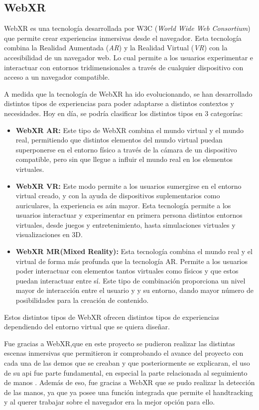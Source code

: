 \documentclass[a4paper, 12pt]{book}
\begin{document}
\subsection{WebXR}
\label{subsec:WebXR}

WebXR \cite{onirix2024} es una tecnología desarrollada por W3C (\textit{World Wide Web Consortium}) que permite crear experiencias inmersivas desde el navegador. Esta tecnología combina la Realidad Aumentada (\textit{AR}) y la Realidad Virtual (\textit{VR}) con la accesibilidad de un navegador web.
Lo cual permite a los usuarios experimentar e interactuar con entornos tridimensionales a través de cualquier dispositivo con acceso a un navegador compatible.

A medida que la tecnología de WebXR ha ido evolucionando, se han desarrollado distintos tipos de experiencias para poder adaptarse a distintos contextos y necesidades. Hoy en día, se podría clasificar los distintos tipos en 3 categorías:
\begin{itemize}
  \item \textbf{WebXR AR:} Este tipo de WebXR combina el mundo virtual y el mundo real, permitiendo que distintos elementos del mundo virtual puedan superponerse en el entorno físico a través
        de la cámara de un dispositivo compatible, pero sin que llegue a influir el mundo real en los elementos virtuales.
  \item \textbf{WebXR VR:} Este modo permite a los usuarios sumergirse en el entorno virtual creado, y con la ayuda de dispositivos suplementarios como auriculares, la experiencia es aún mayor. Esta tecnología permite a los usuarios
        interactuar y experimentar en primera persona distintos entornos virtuales, desde juegos y entretenimiento, hasta simulaciones virtuales y visualizaciones en 3D.
  \item \textbf{WebXR MR(Mixed Reality):} Esta tecnología combina el mundo real y el virtual de forma más profunda que la tecnología AR. Permite a los usuarios poder interactuar con elementos tantos virtuales como físicos y que estos puedan interactuar entre sí. Este tipo de combinación proporciona un nivel mayor de interacción entre el usuario y
        y su entorno, dando mayor número de posibilidades para la creación de contenido.
\end{itemize}

Estos distintos tipos de WebXR ofrecen distintos tipos de experiencias dependiendo del entorno virtual que se quiera diseñar.

Fue gracias a WebXR,que en este proyecto se pudieron realizar las distintas escenas inmersivas que permitieron ir comprobando el avance del proyecto con cada una de las demos que se creaban y que posteriormente se explicaran, el uso de su api \cite{w3c2024} fue parte fundamental, en especial la parte relacionada al seguimiento de manos \cite{w3cHandInput2024}. Además de eso, fue gracias a WebXR que se pudo realizar la detección de las manos, ya que ya posee una función integrada que permite el handtracking y al querer trabajar sobre el navegador era la mejor opción para ello. 
\end{document}
